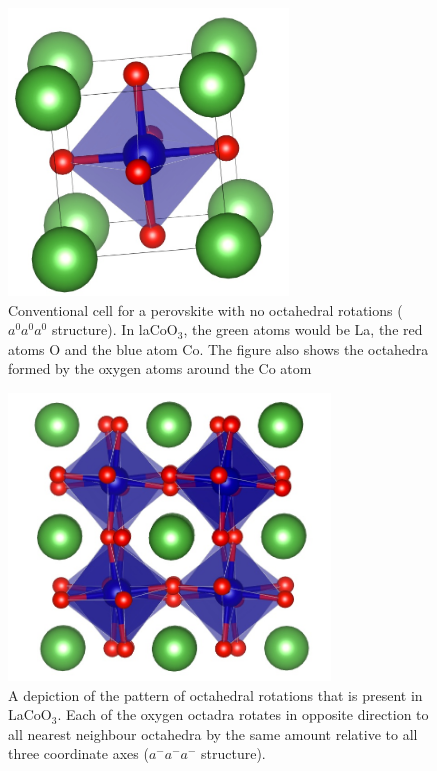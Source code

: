 \documentclass[10pt]{ruthesis}
\begin{document}
{\begin{figure}\label{Perov_struct}
 \begin{center}
 \includegraphics[height=3in]{plots_final/supplement_plots/perovskite_struct}
 \caption{Conventional cell for a perovskite with no octahedral rotations ($a^0a^0a^0$ structure). In laCoO$_3$, the green atoms would be 
La, the red atoms O and the blue atom Co. The figure also shows the octahedra formed by the oxygen atoms around the Co atom}
\end{center}
\end{figure}

\begin{figure}
 \begin{center}
 \includegraphics[height=3in]{plots_final/supplement_plots/a-a-a-_struct}
 \caption{A depiction of the pattern of octahedral rotations that is present in LaCoO$_3$. Each of the oxygen octadra rotates in opposite direction to all nearest neighbour octahedra by the same amount relative to all three coordinate axes ($a^-a^-a^-$ structure).}\label{Sfig:structure}
 \end{center}
 \end{figure}

}
\end{document}
